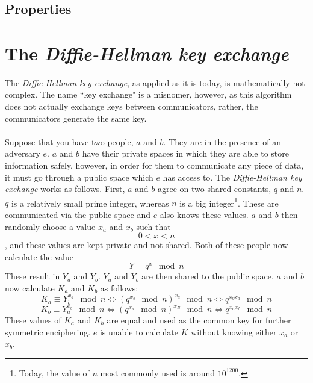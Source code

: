 \documentclass[a4paper, 12pt]{article}
\begin{document}
\subsection{Properties}

\section{The \textit{Diffie-Hellman key exchange}}
\paragraph*{}
The \textit{Diffie-Hellman key exchange}, as applied as it is today, is mathematically not complex. The name ``key 
exchange" is a misnomer, however, as this algorithm does not actually exchange keys between communicators, rather, the 
communicators generate the same key.

\paragraph*{}
Suppose that you have two people, $a$ and $b$. They are in the presence of an adversary $e$. $a$ and $b$ have their 
private spaces in which they are able to store information safely, however, in order for them to communicate any piece 
of data, it must go through a public space which $e$ has access to. The \textit{Diffie-Hellman key exchange} works as 
follows.
First, $a$ and $b$ agree on two shared constants, $q$ and $n$. $q$ is a relatively small prime integer, whereas $n$ is 
a big integer\footnote{Today, the value of $n$ most commonly used is around $10^{1200}$.}. These are communicated via 
the public space and $e$ also knows these values. $a$ and $b$ then randomly choose a value $x_a$ and $x_b$ such that 
$$0 < x < n$$, and these values are kept private and not shared. Both of these people now calculate the value
$$Y = q^x \mod n$$
These result in $Y_a$ and $Y_b$. $Y_a$ and $Y_b$ are then shared to the public space. $a$ and $b$ now calculate
 $K_a$ and $K_b$ as follows:
$$K_a \equiv Y_b^{x_a} \mod n \Longleftrightarrow (q^{x_b} \mod n)^{x_a} \mod n \Longleftrightarrow q^{x_b x_a} \mod n$$
$$K_b \equiv Y_a^{x_b} \mod n \Longleftrightarrow (q^{x_a} \mod n)^{x_B} \mod n \Longleftrightarrow q^{x_a x_b} \mod n$$
These values of $K_a$ and $K_b$ are equal and used as the common key for further symmetric enciphering. $e$ is unable 
to calculate $K$ without knowing either $x_a$ or $x_b$.
\end{document}
